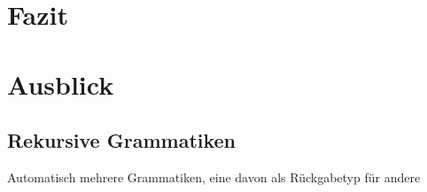\documentclass[../InterneDSLs.tex]{subfiles}
\begin{document}
\chapter{Fazit}

\chapter{Ausblick}
\section{Rekursive Grammatiken}
Automatisch mehrere Grammatiken, eine davon als Rückgabetyp für andere
\end{document}
